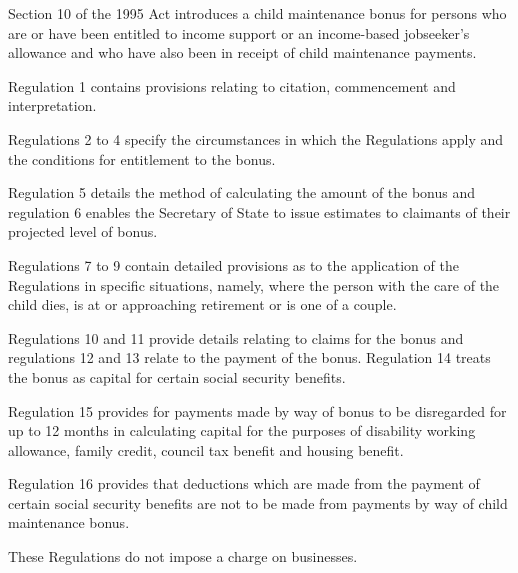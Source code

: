 \documentclass[12pt,a4paper]{article}
\begin{document}
  Section 10 of the 1995 Act introduces a child maintenance bonus for persons who are or have been entitled to income support or an income-based jobseeker’s allowance and who have also been in receipt of child maintenance payments.

  Regulation 1 contains provisions relating to citation, commencement and interpretation.

  Regulations 2 to 4 specify the circumstances in which the Regulations apply and the conditions for entitlement to the bonus.

  Regulation 5 details the method of calculating the amount of the bonus and regulation 6 enables the Secretary of State to issue estimates to claimants of their projected level of bonus.

  Regulations 7 to 9 contain detailed provisions as to the application of the Regulations in specific situations, namely, where the person with the care of the child dies, is at or approaching retirement or is one of a couple.

  Regulations 10 and 11 provide details relating to claims for the bonus and regulations 12 and 13 relate to the payment of the bonus. Regulation 14 treats the bonus as capital for certain social security benefits.

  Regulation 15 provides for payments made by way of bonus to be disregarded for up to 12 months in calculating capital for the purposes of disability working allowance, family credit, council tax benefit and housing benefit.

  Regulation 16 provides that deductions which are made from the payment of certain social security benefits are not to be made from payments by way of child maintenance bonus.

  These Regulations do not impose a charge on businesses.
\end{document}
